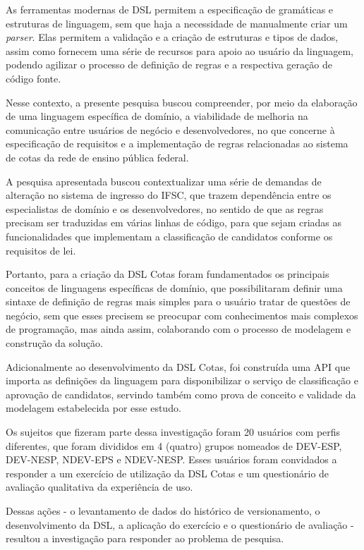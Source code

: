As ferramentas modernas de \gls{DSL} permitem a especificação de gramáticas e estruturas de linguagem, sem que haja a necessidade de manualmente criar um \textit{parser}. Elas permitem a validação e a criação de estruturas e tipos de dados, assim como fornecem uma série de recursos para apoio ao usuário da linguagem, podendo agilizar o processo de definição de regras e a respectiva geração de código fonte.

Nesse contexto, a presente pesquisa buscou compreender, por meio da elaboração de uma linguagem específica de domínio, a viabilidade de melhoria na comunicação entre usuários de negócio e desenvolvedores, no que concerne à especificação de requisitos e a implementação de regras relacionadas ao sistema de cotas da rede de ensino pública federal.

A pesquisa apresentada buscou contextualizar uma série de demandas de alteração no sistema de ingresso do \gls{IFSC}, que trazem dependência entre os especialistas de domínio e os desenvolvedores, no sentido de que as regras precisam ser traduzidas em várias linhas de código, para que sejam criadas as funcionalidades que implementam a classificação de candidatos conforme os requisitos de lei.

Portanto, para a criação da DSL Cotas foram fundamentados os principais conceitos de linguagens específicas de domínio, que possibilitaram definir uma sintaxe de definição de regras mais simples para o usuário tratar de questões de negócio, sem que esses precisem se preocupar com conhecimentos mais complexos de programação, mas ainda assim, colaborando com o processo de modelagem e construção da solução.

Adicionalmente ao desenvolvimento da DSL Cotas, foi construída uma \gls{API} que importa as definições da linguagem para disponibilizar o serviço de classificação e aprovação de candidatos, servindo também como prova de conceito e validade da modelagem estabelecida por esse estudo.

Os sujeitos que fizeram parte dessa investigação foram 20 usuários com perfis diferentes, que foram divididos em 4 (quatro) grupos nomeados de DEV-ESP, DEV-NESP, NDEV-EPS e NDEV-NESP. Esses usuários foram convidados a responder a um exercício de utilização da DSL Cotas e um questionário de avaliação qualitativa da experiência de uso. 
 
Dessas ações - o levantamento de dados do histórico de versionamento, o desenvolvimento da DSL, a aplicação do exercício e o questionário de avaliação - resultou a investigação para responder ao problema de pesquisa. 

